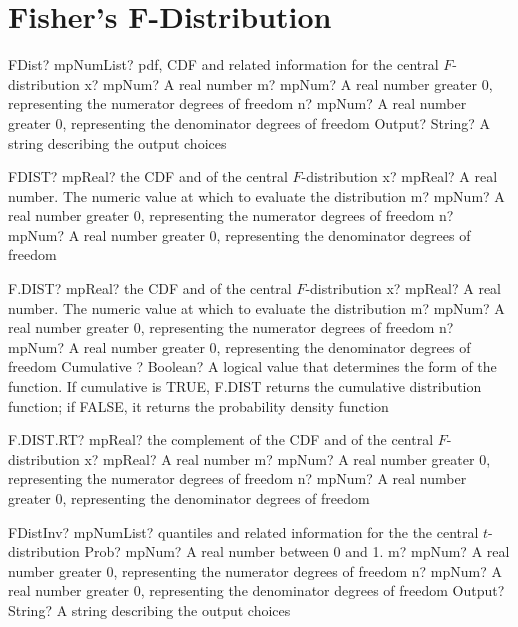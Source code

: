 \documentclass[12pt,a4paper,openany]{book}
\begin{document}
\section{Fisher's F-Distribution}

\begin{mpFunctionsExtract}
\mpFunctionFourNotImplemented
{FDist? mpNumList? pdf, CDF and related information for the central $F$-distribution}
{x? mpNum? A real number}
{m? mpNum? A real number greater 0, representing the numerator  degrees of freedom}
{n? mpNum? A real number greater 0, representing the denominator degrees of freedom}
{Output? String? A string describing the output choices}
\end{mpFunctionsExtract}

\begin{mpFunctionsExtract}
\mpWorksheetFunctionThreeNotImplemented
{FDIST? mpReal? the CDF and of the central $F$-distribution}
{x? mpReal? A real number. The numeric value at which to evaluate the distribution}
{m? mpNum? A real number greater 0, representing the numerator  degrees of freedom}
{n? mpNum? A real number greater 0, representing the denominator degrees of freedom}
\end{mpFunctionsExtract}

\begin{mpFunctionsExtract}
\mpWorksheetFunctionFourNotImplemented
{F.DIST? mpReal? the CDF and of the central $F$-distribution}
{x? mpReal? A real number. The numeric value at which to evaluate the distribution}
{m? mpNum? A real number greater 0, representing the numerator  degrees of freedom}
{n? mpNum? A real number greater 0, representing the denominator degrees of freedom}
{Cumulative ? Boolean? A logical value that determines the form of the function. If cumulative is TRUE, F.DIST returns the cumulative distribution function; if FALSE, it returns the probability density function}
\end{mpFunctionsExtract}

\begin{mpFunctionsExtract}
\mpWorksheetFunctionThreeNotImplemented
{F.DIST.RT? mpReal? the complement of the CDF and of the central $F$-distribution}
{x? mpReal? A real number}
{m? mpNum? A real number greater 0, representing the numerator  degrees of freedom}
{n? mpNum? A real number greater 0, representing the denominator degrees of freedom}
\end{mpFunctionsExtract}

\begin{mpFunctionsExtract}
\mpFunctionThreeNotImplemented
{FDistInv? mpNumList? quantiles and related information for the the central $t$-distribution}
{Prob? mpNum? A real number between 0 and 1.}
{m? mpNum? A real number greater 0, representing the numerator  degrees of freedom}
{n? mpNum? A real number greater 0, representing the denominator degrees of freedom}
{Output? String? A string describing the output choices}
\end{mpFunctionsExtract}
\end{document}
